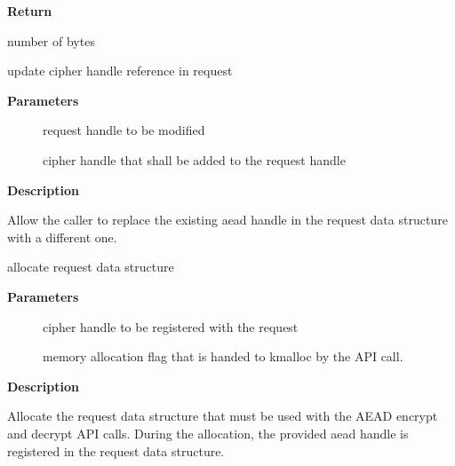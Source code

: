 \documentclass[a4paper,8pt,english]{sphinxmanual}
\begin{document}
\textbf{Return}

number of bytes

\begin{fulllineitems}
\label{crypto/api-aead:c.aead_request_set_tfm}
update cipher handle reference in request

\end{fulllineitems}


\textbf{Parameters}
\begin{description}
\item[{}] \leavevmode
request handle to be modified

\item[{}] \leavevmode
cipher handle that shall be added to the request handle

\end{description}

\textbf{Description}

Allow the caller to replace the existing aead handle in the request
data structure with a different one.

\begin{fulllineitems}
\label{crypto/api-aead:c.aead_request_alloc}
allocate request data structure

\end{fulllineitems}


\textbf{Parameters}
\begin{description}
\item[{}] \leavevmode
cipher handle to be registered with the request

\item[{}] \leavevmode
memory allocation flag that is handed to kmalloc by the API call.

\end{description}

\textbf{Description}

Allocate the request data structure that must be used with the AEAD
encrypt and decrypt API calls. During the allocation, the provided aead
handle is registered in the request data structure.
\end{document}
